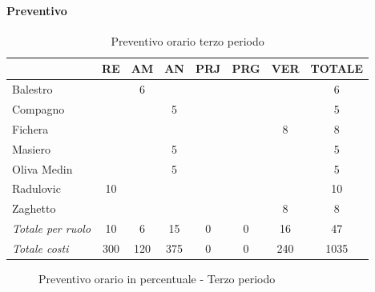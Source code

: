 \documentclass[a4paper,12pt]{article}
\begin{document}
            \paragraph{Preventivo}
                \begin{table}[H]
                \centering
                \begin{tabular}{|l|c|c|c|c|c|c|c|}
                \hline
                    \rowcolor{lightgray}{\textbf{Membro}} & {\textbf{RE}} & {\textbf{AM}} & {\textbf{AN}} & {\textbf{PRJ}} & {\textbf{PRG}} & {\textbf{VER}} & {\textbf{TOTALE}}\\
                \hline
                    Balestro & & 6 & & & & & 6\\
                \hline
                    Compagno & & & 5 & & & & 5\\
                \hline
                    Fichera & & & & & & 8 & 8\\
                \hline
                    Masiero & & & 5 & & & & 5\\
                \hline
                    Oliva Medin & & & 5 & & & & 5\\
                \hline
                    Radulovic & 10 & & & & & & 10\\
                \hline
                    Zaghetto & & & & & & 8 & 8\\
                \hline
                    \rowcolor{lightgray}\textit{Totale per ruolo} & 10 & 6 & 15 & 0 & 0 & 16 & 47\\
                \hline
                    \rowcolor{lightgray}\textit{Totale costi} & 300 & 120 & 375 & 0 & 0 & 240 & 1035\\
                \hline
                \end{tabular}
                \caption{Preventivo orario terzo periodo}
                \end{table}

                \begin{figure}[H]
                \centering
                \caption{Preventivo orario in percentuale - Terzo periodo}
                \end{figure}
                
\end{document}
